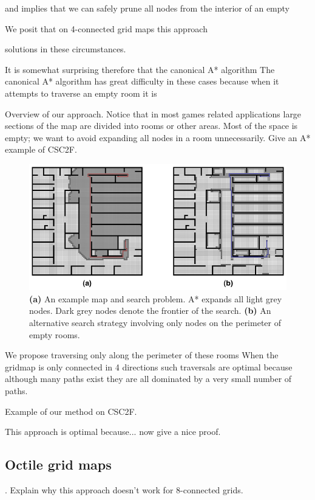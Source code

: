  and implies that we can safely prune all nodes from the interior
of an empty 


We posit that on 4-connected grid maps this approach 


solutions in these circumstances.

It is somewhat surprising therefore that the canonical A* algorithm
The canonical A* algorithm has great difficulty in these cases because when
it attempts to traverse an empty room it is 

Overview of our approach.
Notice that in most games related applications large sections
of the map are divided into rooms or other areas. 
Most of the space is empty; we want to avoid expanding all nodes in 
a room unnecessarily.
Give an A* example of CSC2F. 

\begin{figure}[htbp]
	\vspace{-4pt}
       \begin{center}
                       \includegraphics[scale=0.50, trim = 20mm 20mm 20mm 0mm]{diagrams/oha_contrast.png}
       \end{center}
	\vspace{-3pt}
       \caption{\textbf{(a)} An example map and search problem. A* expands all light grey nodes.
			Dark grey nodes denote the frontier of the search. \textbf{(b)} An alternative search strategy involving
			only nodes on the perimeter of empty rooms.}
       \label{fig-ohacontrast}
	\vspace{-12pt}
\end{figure}

We propose traversing only along the perimeter of these rooms
When the gridmap is only connected in 4 directions such traversals
are optimal because although many paths exist they are all dominated
by a very small number of paths.

Example of our method on CSC2F. 

This approach is optimal because... now give a nice proof.

\subsection{Octile grid maps}.
Explain why this approach doesn't work for 8-connected grids.
